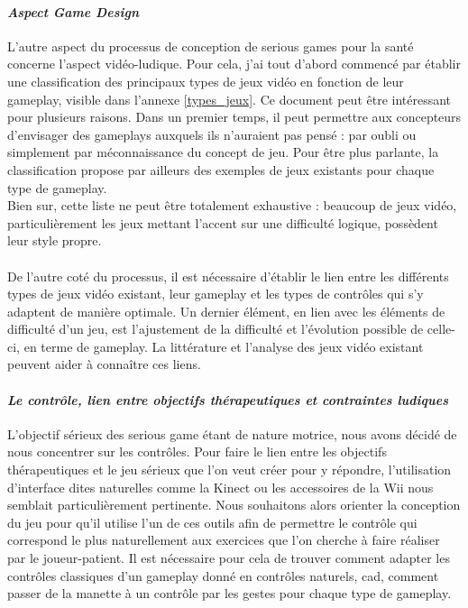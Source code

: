 			\paragraph{\emph{Aspect Game Design}\\}
L'autre aspect du processus de conception de serious games pour la santé concerne l'aspect vidéo-ludique. Pour cela, j'ai tout d'abord commencé par établir une classification des principaux types de jeux vidéo en fonction de leur gameplay, visible dans l'annexe \ref{types_jeux}. Ce document peut être intéressant pour plusieurs raisons. Dans un premier temps, il peut permettre aux concepteurs d'envisager des gameplays auxquels ils n'auraient pas pensé : par oubli ou simplement par méconnaissance du concept de jeu. Pour être plus parlante, la classification propose par ailleurs des exemples de jeux existants pour chaque type de gameplay. \\
Bien sur, cette liste ne peut être totalement exhaustive : beaucoup de jeux vidéo, particulièrement les jeux mettant l'accent sur une difficulté logique, possèdent leur style propre.

\paragraph{}
De l’autre coté du processus, il est nécessaire d’établir le lien entre les différents types de jeux vidéo existant, leur gameplay et les types de contrôles qui s’y adaptent de manière optimale. Un dernier élément, en lien avec les éléments de difficulté d’un jeu, est l’ajustement de la difficulté et l’évolution possible de celle-ci, en terme de gameplay. La littérature et l’analyse des jeux vidéo existant peuvent aider à connaître ces liens. 

			\paragraph{\emph{Le contrôle, lien entre objectifs thérapeutiques et contraintes ludiques}\\}
L’objectif sérieux des serious game étant de nature motrice, nous avons décidé de nous concentrer sur les contrôles. Pour faire le lien entre les objectifs thérapeutiques et le jeu sérieux que l’on veut créer pour y répondre, l’utilisation d’interface dites naturelles comme la Kinect ou les accessoires de la Wii nous semblait particulièrement pertinente. Nous souhaitons alors orienter la conception du jeu pour qu’il utilise l’un de ces outils afin de permettre le contrôle qui correspond le plus naturellement aux exercices que l’on cherche à faire réaliser par le joueur-patient. Il est nécessaire pour cela de trouver comment adapter les contrôles classiques d’un gameplay donné en contrôles naturels, cad, comment passer de la manette à un contrôle par les gestes pour chaque type de gameplay.

